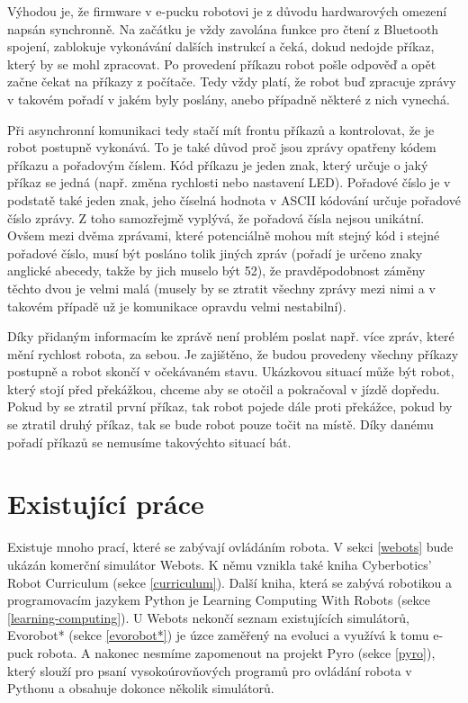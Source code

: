     Výhodou je, že firmware v e-pucku robotovi je z důvodu hardwarových omezení
    napsán synchronně. Na začátku je vždy zavolána funkce pro čtení z Bluetooth
    spojení, zablokuje vykonávání dalších instrukcí a čeká, dokud nedojde
    příkaz, který by se mohl zpracovat. Po provedení příkazu robot pošle
    odpověď a opět začne čekat na příkazy z počítače. Tedy vždy platí, že robot
    buď zpracuje zprávy v takovém pořadí v jakém byly poslány, anebo případně
    některé z nich vynechá.

    Při asynchronní komunikaci tedy stačí mít frontu příkazů a kontrolovat, že
    je robot postupně vykonává. To je také důvod proč jsou zprávy opatřeny
    kódem příkazu a pořadovým číslem. Kód příkazu je jeden znak, který určuje o
    jaký příkaz se jedná (např. změna rychlosti nebo nastavení LED). Pořadové
    číslo je v podstatě také jeden znak, jeho číselná hodnota v ASCII kódování
    určuje pořadové číslo zprávy. Z toho samozřejmě vyplývá, že pořadová čísla
    nejsou unikátní. Ovšem mezi dvěma zprávami, které potenciálně mohou mít
    stejný kód i stejné pořadové číslo, musí být posláno tolik jiných zpráv
    (pořadí je určeno znaky anglické abecedy, takže by jich muselo být 52), že
    pravděpodobnost záměny těchto dvou je velmi malá (musely by se ztratit
    všechny zprávy mezi nimi a v takovém případě už je komunikace opravdu velmi
    nestabilní).

    Díky přidaným informacím ke zprávě není problém poslat např. více zpráv,
    které mění rychlost robota, za sebou. Je zajištěno, že budou provedeny
    všechny příkazy postupně a robot skončí v očekávaném stavu. Ukázkovou
    situací může být robot, který stojí před překážkou, chceme aby se otočil a
    pokračoval v jízdě dopředu. Pokud by se ztratil první příkaz, tak robot
    pojede dále proti překážce, pokud by se ztratil druhý příkaz, tak se bude
    robot pouze točit na místě. Díky danému pořadí příkazů se nemusíme
    takovýchto situací bát.

    \section{Existující práce}
    \label{existujici prace}

        Existuje mnoho prací, které se zabývají ovládáním robota. V sekci
        \ref{webots} bude ukázán komerční simulátor Webots. K němu vznikla také
        kniha Cyberbotics' Robot Curriculum (sekce \ref{curriculum}). Další
        kniha, která se zabývá robotikou a programovacím jazykem Python je
        Learning Computing With Robots (sekce \ref{learning-computing}). U
        Webots nekončí seznam existujících simulátorů, Evorobot* (sekce
        \ref{evorobot*}) je úzce zaměřený na evoluci a využívá k tomu e-puck
        robota. A nakonec nesmíme zapomenout na projekt Pyro (sekce
        \ref{pyro}), který slouží pro psaní vysokoúrovňových programů pro
        ovládání robota v Pythonu a obsahuje dokonce několik simulátorů.

